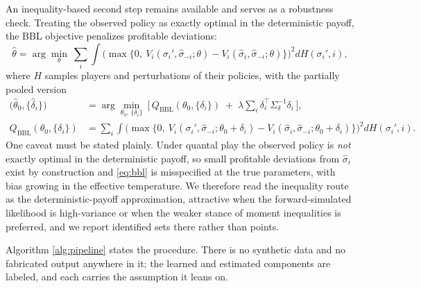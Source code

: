 \documentclass[11pt]{article}
\theoremstyle{definition}
\begin{document}
An inequality-based second step remains available and serves as a robustness check. Treating the observed policy as exactly optimal in the deterministic payoff, the BBL objective penalizes profitable deviations:
\begin{equation}
\widehat\theta = \arg\min_{\theta}\ \sum_{i}\int
\Big(\max\big\{0,\ V_i(\sigma_i',\hat\sigma_{-i};\theta) - V_i(\hat\sigma_i,\hat\sigma_{-i};\theta)\big\}\Big)^{2} dH(\sigma_i',i),
\label{eq:bbl}
\end{equation}
where $H$ samples players and perturbations of their policies, with the partially pooled version
\begin{equation}
\begin{aligned}
\big(\widehat\theta_0,\{\widehat\delta_i\}\big)
&= \arg\min_{\theta_0,\,\{\delta_i\}}\ \Big[\, Q_{\mathrm{BBL}}(\theta_0,\{\delta_i\}) \;+\; \lambda \sum_i \delta_i^{\top}\Sigma_\delta^{-1}\delta_i \,\Big], \\[2pt]
Q_{\mathrm{BBL}}(\theta_0,\{\delta_i\}) &= \sum_{i}\int\Big(\max\big\{0,\ V_i(\sigma_i',\hat\sigma_{-i};\theta_0+\delta_i) - V_i(\hat\sigma_i,\hat\sigma_{-i};\theta_0+\delta_i)\big\}\Big)^{2} dH(\sigma_i',i).
\end{aligned}
\label{eq:pooled}
\end{equation}
One caveat must be stated plainly. Under quantal play the observed policy is \emph{not} exactly optimal in the deterministic payoff, so small profitable deviations from $\hat\sigma_i$ exist by construction and \eqref{eq:bbl} is misspecified at the true parameters, with bias growing in the effective temperature. We therefore read the inequality route as the deterministic-payoff approximation, attractive when the forward-simulated likelihood is high-variance or when the weaker stance of moment inequalities is preferred, and we report identified sets there rather than points.

Algorithm \ref{alg:pipeline} states the procedure. There is no synthetic data and no fabricated output anywhere in it; the learned and estimated components are labeled, and each carries the assumption it leans on.
\end{document}
